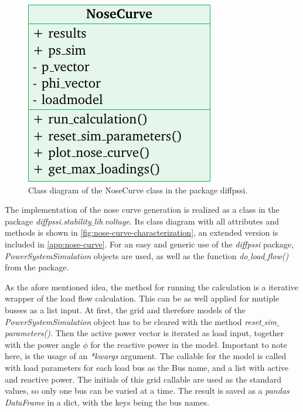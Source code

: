 \begin{figure}
        \centering
        \includegraphics[width=.9\linewidth]{tikz_graphics/images/class_diagram_nosecurve_red.pdf}
        \caption[Class diagram of the NoseCurve class in the package diffpssi]{Class diagram of the NoseCurve class in the package diffpssi.}
        \label{fig:nose-curve-characterization}
\end{figure}
The implementation of the nose curve generation is realized as a class in the package {\itshape diffpssi.stability$\_$lib.voltage}.
Its class diagram with all attributes and methods is shown in \autoref{fig:nose-curve-characterization}, an extended version is included in \autoref{app:nose-curve}.
For an easy and generic use of the {\itshape diffpssi} package, {\itshape PowerSystemSimulation} objects are used, as well as the function {\itshape do$\_$load$\_$flow()} from the package.

As the afore mentioned idea, the method for running the calculation is a iterative wrapper of the load flow calculation. 
This can be as well applied for mutiple busses as a list input.
At first, the grid and therefore models of the {\itshape PowerSystemSimulation} object has to be cleared with the method {\itshape reset$\_$sim$\_$parameters()}.
Then the active power vector is iterated as load input, together with the power angle $\phi$ for the reactive power in the model.
Important to note here, is the usage of an {\itshape **kwargs} argument.
The callable for the model is called with load parameters for each load bus as the Bus name, and a list with active and reactive power.
The initials of this grid callable are used as the standard values, so only one bus can be varied at a time.
The result is saved as a {\itshape pandas DataFrame} in a dict, with the keys being the bus names.


